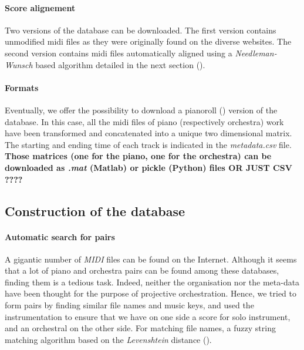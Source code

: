 \documentclass[twoside,twocolumn]{article}
\begin{document}
\paragraph{Score alignement}
Two versions of the database can be downloaded. The first version contains unmodified midi files as they were originally found on the diverse websites. The second version contains midi files automatically aligned using a \textit{Needleman-Wunsch} \cite{NEEDLEMAN1970443} based  algorithm detailed in the next section ().

\paragraph{Formats}
Eventually, we offer the possibility to download a pianoroll () version of the database. In this case, all the midi files of piano (respectively orchestra) work have been transformed and concatenated into a unique two dimensional matrix. The starting and ending time of each track is indicated in the \textit{metadata.csv} file. \textbf{Those matrices (one for the piano, one for the orchestra) can be downloaded as \textit{.mat} (Matlab) or pickle (Python) files OR JUST CSV ????}

\subsection{Construction of the database}
\paragraph{Automatic search for pairs}
A gigantic number of \textit{MIDI} files can be found on the Internet.
Although it seems that a lot of piano and orchestra pairs can be found among these databases,
finding them is a tedious task. Indeed, neither the organisation nor the meta-data have been thought for the purpose of projective orchestration.
 Hence, we tried to form pairs by finding similar file names and music keys, and used the instrumentation to ensure that we have on one side a score for solo instrument, and an orchestral on the other side. 
For matching file names, a fuzzy string matching algorithm based on the \textit{Levenshtein} distance (\cite{fuzzywuzzy}).

\end{document}
